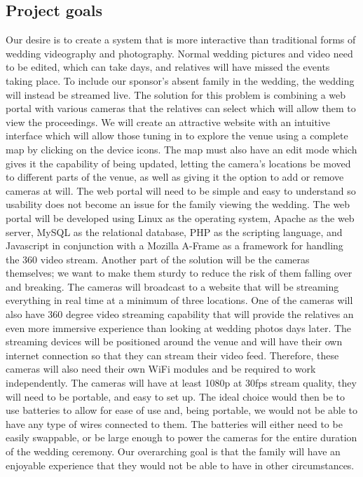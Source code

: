\documentclass[onecolumn, draftclsnofoot,10pt, compsoc]{IEEEtran}
\begin{document}
    \subsection{Project goals}
     Our desire is to create a system that is more interactive than traditional forms of wedding videography and photography.
    Normal wedding pictures and video need to be edited, which can take days, and relatives will have missed the events taking place.
    To include our sponsor's absent family in the wedding, the wedding will instead be streamed live. 
    The solution for this problem is combining a web portal with various cameras that the relatives can select which will allow them to view the proceedings.
    We will create an attractive website with an intuitive interface which will allow those tuning in to explore the venue using a complete map by clicking on the device icons. 
    The map must also have an edit mode which gives it the capability of being updated, letting the camera's locations be moved to different parts of the venue, as well as giving it the option to add or remove cameras at will.
    The web portal will need to be simple and easy to understand so usability does not become an issue for the family viewing the wedding.
    The web portal will be developed using Linux as the operating system, Apache as the web server, MySQL as the relational database, PHP as the scripting language, and Javascript in conjunction with a Mozilla A-Frame as a framework for handling the 360 video stream. 
\newline
\newline
    Another part of the solution will be the cameras themselves; we want to make them sturdy to reduce the risk of them falling over and breaking. 
    The cameras will broadcast to a website that will be streaming everything in real time at a minimum of three locations. 
    One of the cameras will also have 360 degree video streaming capability that will provide the relatives an even more immersive experience than looking at wedding photos days later. 
    The streaming devices will be positioned around the venue and will have their own internet connection so that they can stream their video feed.
    Therefore, these cameras will also need their own WiFi modules and be required to work independently.
    The cameras will have at least 1080p at 30fps stream quality, they will need to be portable, and easy to set up.
    The ideal choice would then be to use batteries to allow for ease of use and, being portable, we would not be able to have any type of wires connected to them.
    The batteries will either need to be easily swappable, or be large enough to power the cameras for the entire duration of the wedding ceremony.
    Our overarching goal is that the family will have an enjoyable experience that they would not be able to have in other circumstances.
    
\end{document}
